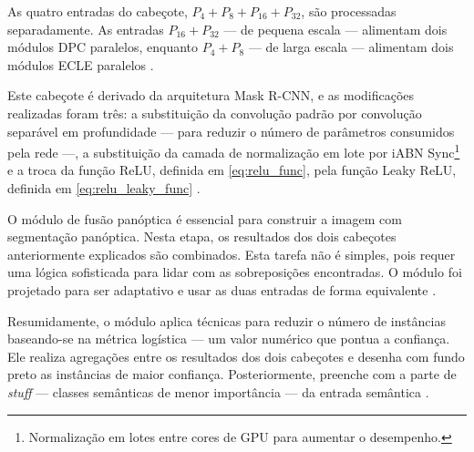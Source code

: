 As quatro entradas do cabeçote, \( P_4 + P_8 + P_{16} + P_{32} \), são processadas separadamente. As entradas \( P_{16} + P_{32} \) — de pequena escala — alimentam dois módulos DPC paralelos, enquanto \( P_4 + P_8 \) — de larga escala — alimentam dois módulos ECLE paralelos \cite{mohan2020efficientps}.



Este cabeçote é derivado da arquitetura Mask R-CNN, e as modificações realizadas foram três: a substituição da convolução padrão por convolução separável em profundidade — para reduzir o número de parâmetros consumidos pela rede —, a substituição da camada de normalização em lote por iABN Sync\footnote{Normalização em lotes entre cores de GPU para aumentar o desempenho.} e a troca da função ReLU, definida em \cref{eq:relu_func}, pela função Leaky ReLU, definida em \cref{eq:relu_leaky_func} \cite{mohan2020efficientps, redes-neurais-convolucionais-separaveis-em-profundidade, serp-ai}.


O módulo de fusão panóptica é essencial para construir a imagem com segmentação panóptica. Nesta etapa, os resultados dos dois cabeçotes anteriormente explicados são combinados. Esta tarefa não é simples, pois requer uma lógica sofisticada para lidar com as sobreposições encontradas. O módulo foi projetado para ser adaptativo e usar as duas entradas de forma equivalente \cite{mohan2020efficientps}.

Resumidamente, o módulo aplica técnicas para reduzir o número de instâncias baseando-se na métrica logística — um valor numérico que pontua a confiança. Ele realiza agregações entre os resultados dos dois cabeçotes e desenha com fundo preto as instâncias de maior confiança. Posteriormente, preenche com a parte de \textit{stuff} — classes semânticas de menor importância — da entrada semântica \cite{mohan2020efficientps}.
